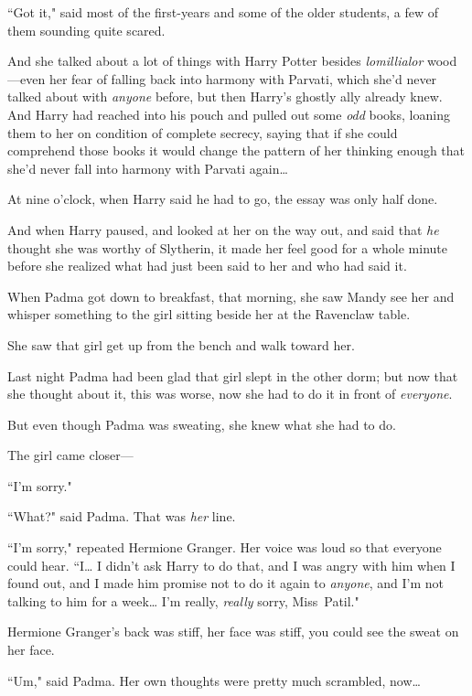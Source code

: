 ``Got it," said most of the first-years and some of the older students, a few of them sounding quite scared.

\later

And she talked about a lot of things with Harry Potter besides \emph{lomillialor} wood---even her fear of falling back into harmony with Parvati, which she'd never talked about with \emph{anyone} before, but then Harry's ghostly ally already knew. And Harry had reached into his pouch and pulled out some \emph{odd} books, loaning them to her on condition of complete secrecy, saying that if she could comprehend those books it would change the pattern of her thinking enough that she'd never fall into harmony with Parvati again{\ldots}

At nine o'clock, when Harry said he had to go, the essay was only half done.

And when Harry paused, and looked at her on the way out, and said that \emph{he} thought she was worthy of Slytherin, it made her feel good for a whole minute before she realized what had just been said to her and who had said it.

\later

When Padma got down to breakfast, that morning, she saw Mandy see her and whisper something to the girl sitting beside her at the Ravenclaw table.

She saw that girl get up from the bench and walk toward her.

Last night Padma had been glad that girl slept in the other dorm; but now that she thought about it, this was worse, now she had to do it in front of \emph{everyone}.

But even though Padma was sweating, she knew what she had to do.

The girl came closer---

``I'm sorry."

``What?" said Padma. That was \emph{her} line.

``I'm sorry," repeated Hermione Granger. Her voice was loud so that everyone could hear. ``I{\ldots} I didn't ask Harry to do that, and I was angry with him when I found out, and I made him promise not to do it again to \emph{anyone}, and I'm not talking to him for a week{\ldots} I'm really, \emph{really} sorry, Miss~Patil."

Hermione Granger's back was stiff, her face was stiff, you could see the sweat on her face.

``Um," said Padma. Her own thoughts were pretty much scrambled, now{\ldots}

